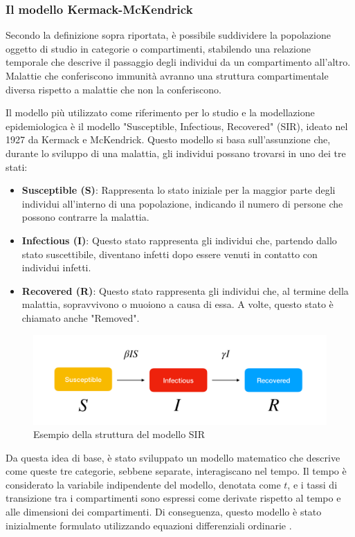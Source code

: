 \subsubsection{Il modello Kermack-McKendrick}

Secondo la definizione sopra riportata, è possibile suddividere la 
popolazione oggetto di studio in categorie o compartimenti, stabilendo 
una relazione temporale che descrive il passaggio degli individui da un 
compartimento all'altro. Malattie che conferiscono immunità avranno una 
struttura compartimentale diversa rispetto a malattie che non la 
conferiscono.

Il modello più utilizzato come riferimento per lo studio e la 
modellazione epidemiologica è il modello "Susceptible, Infectious, 
Recovered" (SIR), ideato nel 1927 da Kermack e McKendrick. 
Questo modello si basa sull'assunzione che, durante lo sviluppo di una 
malattia, gli individui possano trovarsi in uno dei tre stati:

\begin{itemize}
    \item \textbf{Susceptible (S)}: Rappresenta lo stato iniziale per la maggior parte degli individui all'interno di una popolazione, indicando il numero di persone che possono contrarre la malattia.
    \item \textbf{Infectious (I)}: Questo stato rappresenta gli individui che, partendo dallo stato suscettibile, diventano infetti dopo essere venuti in contatto con individui infetti.
    \item \textbf{Recovered (R)}: Questo stato rappresenta gli individui che, al termine della malattia, sopravvivono o muoiono a causa di essa. A volte, questo stato è chiamato anche "Removed".
\end{itemize}

\begin{figure}[h]
    \includegraphics[width=\linewidth]{img/sir.png}
    \caption{Esempio della struttura del modello SIR} 
    \label{fig:SIR_Structure}
\end{figure}

Da questa idea di base, è stato sviluppato un modello matematico che 
descrive come queste tre categorie, sebbene separate, interagiscano 
nel tempo. Il tempo è considerato la variabile indipendente del modello, 
denotata come $t$, e i tassi di transizione tra i compartimenti sono 
espressi come derivate rispetto al tempo e alle dimensioni dei 
compartimenti. Di conseguenza, questo modello è stato inizialmente 
formulato utilizzando equazioni differenziali ordinarie \cite{Brauer2008}.

